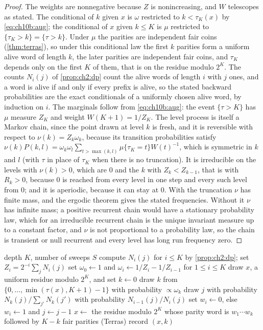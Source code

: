 \begin{proof}
The weights are nonnegative because $Z$ is nonincreasing, and $W$ telescopes as
stated. The conditional of $k$ given $x$ is $\omega$ restricted to $k<\tau_K(x)$
by \eqref{eq:ch10b:aug}; the conditional of $x$ given $k\le K$ is $\mu$ restricted
to $\{\tau_K>k\}=\{\tau>k\}$. Under $\mu$ the parities are independent fair coins (\cref{thm:terras}), so under this conditional law the first $k$ parities form a uniform alive word of length $k$, the later parities are independent fair coins, and $\tau_K$ depends only on the first $K$ of them, that is on the residue modulo $2^K$. The counts $N_i(j)$ of \cref{prop:ch2:dp} count the alive
words of length $i$ with $j$ ones, and a word is alive if and only if every
prefix is alive, so the stated backward probabilities are the exact
conditionals of a uniformly chosen alive word, by induction on $i$. The
marginals follow from \eqref{eq:ch10b:aug}: the event $\{\tau>K\}$ has $\mu$ measure $Z_K$ and weight $W(K+1)=1/Z_K$.
The level process is itself a Markov chain, since the point drawn at level $k$ is fresh, and it is reversible with respect to $\nu(k)=Z_k\omega_k$, because its transition probabilities satisfy $\nu(k)P(k,l)=\omega_k\omega_l\sum_{t>\max(k,l)}\mu\{\tau_K=t\}W(t)^{-1}$, which is symmetric in $k$ and $l$ (with $\tau$ in place of $\tau_K$ when there is no truncation). It is irreducible on the levels with $\nu(k)>0$, which are $0$ and the $k$ with $Z_k<Z_{k-1}$, that is with $R_k>0$, because $0$ is reached from every level in one step and every such level from $0$; and it is aperiodic, because it can stay at $0$. With the truncation $\nu$ has finite mass, and the ergodic theorem gives the stated frequencies. Without it $\nu$ has infinite mass; a positive recurrent chain would have a stationary probability law, which for an irreducible recurrent chain is the unique invariant measure up to a constant factor, and $\nu$ is not proportional to a probability law, so the chain is transient or null recurrent and every level has long run frequency zero.
\end{proof}

\begin{algorithm}[t]
\caption{Perfect split sampling for the coefficient stopping time}
\label{alg:perfectsplit}
\begin{algorithmic}[1]
\Require depth $K$, number of sweeps $S$
\State compute $N_i(j)$ for $i\le K$ by \cref{prop:ch2:dp}; set $Z_i=2^{-i}\sum_jN_i(j)$
\State set $\omega_0\gets1$ and $\omega_i\gets1/Z_i-1/Z_{i-1}$ for $1\le i\le K$
\State draw $x$, a uniform residue modulo $2^K$, and set $k\gets0$
  \State draw $k$ from $\{0,\dots,\min(\tau(x),K+1)-1\}$ with probability $\propto\omega_k$
  \State draw $j$ with probability $N_k(j)/\sum_{j'}N_k(j')$
    \State with probability $N_{i-1}(j)/N_i(j)$ set $w_i\gets0$, else $w_i\gets1$ and $j\gets j-1$
  \EndFor
  \State $x\gets$ the residue modulo $2^K$ whose parity word is $w_1\cdots w_k$ followed by $K-k$ fair parities (Terras)
  \State record $(x,k)$
\EndFor
\end{algorithmic}
\end{algorithm}

